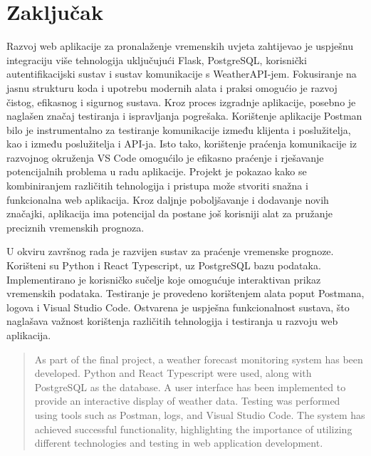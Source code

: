 \documentclass[times, utf8, zavrsni]{fer}
\begin{document}
\chapter{Zaključak}
Razvoj web aplikacije za pronalaženje vremenskih uvjeta zahtijevao je uspješnu integraciju više tehnologija uključujući Flask, PostgreSQL, korisnički autentifikacijski sustav i sustav komunikacije s WeatherAPI-jem. Fokusiranje na jasnu strukturu koda i upotrebu modernih alata i praksi omogućio je razvoj čistog, efikasnog i sigurnog sustava. Kroz proces izgradnje aplikacije, posebno je naglašen značaj testiranja i ispravljanja pogrešaka. Korištenje aplikacije Postman bilo je instrumentalno za testiranje komunikacije između klijenta i poslužitelja, kao i između poslužitelja i API-ja. Isto tako, korištenje praćenja komunikacije iz razvojnog okruženja VS Code omogućilo je efikasno praćenje i rješavanje potencijalnih problema u radu aplikacije. Projekt je pokazao kako se kombiniranjem različitih tehnologija i pristupa može stvoriti snažna i funkcionalna web aplikacija. Kroz daljnje poboljšavanje i dodavanje novih značajki, aplikacija ima potencijal da postane još korisniji alat za pružanje preciznih vremenskih prognoza.

\printbibliography[title=Literatura]


\begin{sazetak}
U okviru završnog rada je razvijen sustav za praćenje vremenske prognoze. Korišteni su Python i React Typescript, uz PostgreSQL bazu podataka. Implementirano je korisničko sučelje koje omogućuje interaktivan prikaz vremenskih podataka. Testiranje je provedeno korištenjem alata poput Postmana, logova i Visual Studio Code. Ostvarena je uspješna funkcionalnost sustava, što naglašava važnost korištenja različitih tehnologija i testiranja u razvoju web aplikacija.

\end{sazetak}

\begin{abstract}
As part of the final project, a weather forecast monitoring system has been developed. Python and React Typescript were used, along with PostgreSQL as the database. A user interface has been implemented to provide an interactive display of weather data. Testing was performed using tools such as Postman, logs, and Visual Studio Code. The system has achieved successful functionality, highlighting the importance of utilizing different technologies and testing in web application development.

\end{abstract}
\end{document}
